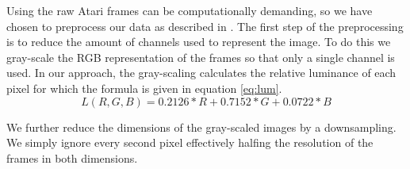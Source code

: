 \documentclass[11pt]{article}
\begin{document}
Using the raw Atari frames can be computationally demanding, so we have chosen
to preprocess our data as described in \cite{dqn}. 
The first step of the preprocessing is to reduce the amount of channels used to
represent the image.
To do this we gray-scale the RGB representation of the frames so that only a single channel is used.
In our approach, the gray-scaling calculates the relative luminance\cite{luminance} of each pixel
for which the formula is given in equation \ref{eq:lum}.
\begin{equation}\label{eq:lum}
    L(R, G, B) = 0.2126*R + 0.7152*G + 0.0722*B
\end{equation}

We further reduce the dimensions of the gray-scaled images by a downsampling.
We simply ignore every second pixel effectively halfing the resolution of the frames 
in both dimensions.
\end{document}
